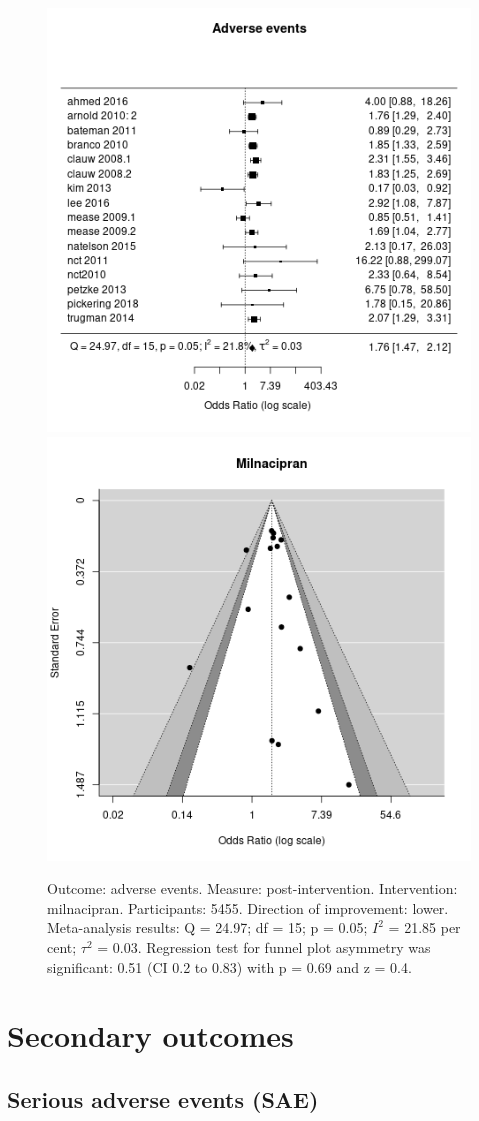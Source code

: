 \documentclass{report}\usepackage[]{graphicx}\usepackage[]{color}
\newenvironment{knitrout}{}{} %
\begin{document}
\begin{figure}

\begin{knitrout}
\color{fgcolor}
\includegraphics[width=0.5\linewidth,height=0.35\textheight]{img/adverse-milnacipran- - -forest} 
\includegraphics[width=0.5\linewidth,height=0.35\textheight]{img/adverse-milnacipran- - -funnel} 
\end{knitrout}

\caption[Adverse events: milnacipran]{Outcome: adverse events. Measure: post-intervention. Intervention: milnacipran. Participants: 5455. Direction of improvement: lower. Meta-analysis results: Q = 24.97; df = 15; p = 0.05; $I^2$ = 21.85 per cent; $\tau^2$ = 0.03. Regression test for funnel plot asymmetry was significant: 0.51 (CI 0.2 to 0.83) with p = 0.69 and z = 0.4.}
\label{fig:adverse-amitrip}
\end{figure}

\chapter{Secondary outcomes}


\section{Serious adverse events (SAE)}
\end{document}
